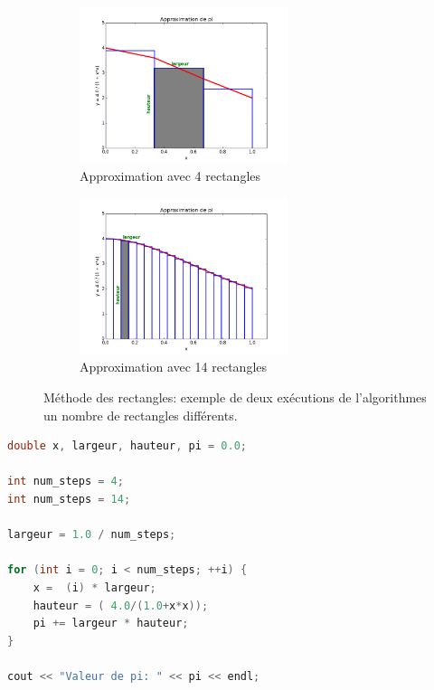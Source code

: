             \begin{figure}[t!]
                \centering
                \begin{subfigure}[t]{0.5\textwidth}
                    \label{pic_pi_1}
                    \centering
                    \includegraphics[height=1.8in]{images/Chapitre1/pic_pi_rect_1.png}
                    \caption{Approximation avec 4 rectangles}
                \end{subfigure}%
            \begin{subfigure}[t]{0.5\textwidth}
                    \label{pic_pi_2}
                    \centering
                    \includegraphics[height=1.8in]{images/Chapitre1/pic_pi_rect_2.png}
                    \caption{Approximation avec 14 rectangles}
                \end{subfigure}
                \caption{Méthode des rectangles: exemple de deux exécutions de l'algorithmes un nombre de rectangles différents.}
                \label{pic_pi_rect}
            \end{figure}
            
            \begin{lstlisting}[language=C, caption=Implémentions de l'algorithme de calcul d'intégrale par la méthode des rectangles, float,floatplacement=H]
double x, largeur, hauteur, pi = 0.0;

int num_steps = 4;
int num_steps = 14;

largeur = 1.0 / num_steps;

for (int i = 0; i < num_steps; ++i) {
    x =  (i) * largeur;
    hauteur = ( 4.0/(1.0+x*x));
    pi += largeur * hauteur;
}

cout << "Valeur de pi: " << pi << endl;
\end{lstlisting}
    
